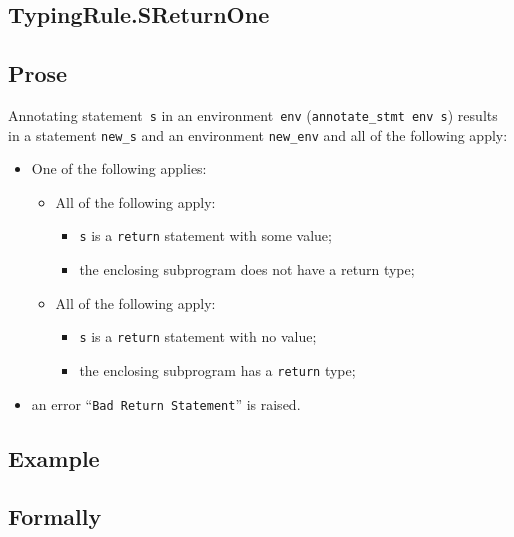 \documentclass{book}
\begin{document}
\begin{itemize}
\section{TypingRule.SReturnOne \label{sec:TypingRule.SReturnOne}}

  \subsection{Prose}
Annotating statement~\texttt{s} in an environment~\texttt{env}
(\texttt{annotate\_stmt env s}) results in a statement \texttt{new\_s} and an
environment \texttt{new\_env} and all of the following apply:
   \begin{itemize}
   \item One of the following applies:
     \begin{itemize}
     \item All of the following apply:
       \begin{itemize}
       \item \texttt{s} is a \texttt{return} statement with some value;
       \item the enclosing subprogram does not have a return type;
       \end{itemize}
     \item All of the following apply:
       \begin{itemize}
       \item \texttt{s} is a \texttt{return} statement with no value;
       \item the enclosing subprogram has a \texttt{return} type;
       \end{itemize}
     \end{itemize}
   \item an error ``\texttt{Bad Return Statement}'' is raised.
   \end{itemize}

  \subsection{Example}



\begin{emptyformal}
    \subsection{Formally}
\end{emptyformal}


\end{itemize}
\end{document}
